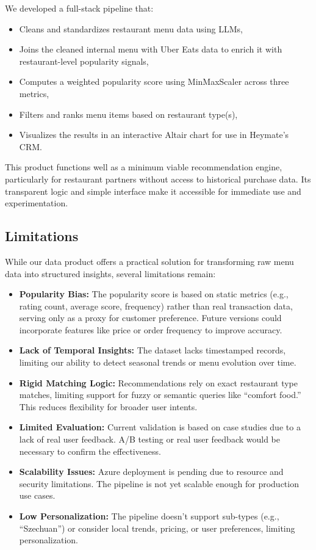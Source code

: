 \documentclass[
  11pt,
  a4paper,
  DIV=11,
  numbers=noendperiod]{scrartcl}
\providecommand{\tightlist}{%
  \setlength{\itemsep}{0pt}\setlength{\parskip}{0pt}}\usepackage{longtable,booktabs,array}
\begin{document}
We developed a full-stack pipeline that:

\begin{itemize}
\tightlist
\item
  Cleans and standardizes restaurant menu data using LLMs,
\item
  Joins the cleaned internal menu with Uber Eats data to enrich it with
  restaurant-level popularity signals,
\item
  Computes a weighted popularity score using MinMaxScaler across three
  metrics,
\item
  Filters and ranks menu items based on restaurant type(s),
\item
  Visualizes the results in an interactive Altair chart for use in
  Heymate's CRM.
\end{itemize}

This product functions well as a minimum viable recommendation engine,
particularly for restaurant partners without access to historical
purchase data. Its transparent logic and simple interface make it
accessible for immediate use and experimentation.

\subsection{Limitations}\label{limitations-1}

While our data product offers a practical solution for transforming raw
menu data into structured insights, several limitations remain:

\begin{itemize}
\tightlist
\item
  \textbf{Popularity Bias:} The popularity score is based on static
  metrics (e.g., rating count, average score, frequency) rather than
  real transaction data, serving only as a proxy for customer
  preference. Future versions could incorporate features like price or
  order frequency to improve accuracy.
\item
  \textbf{Lack of Temporal Insights:} The dataset lacks timestamped
  records, limiting our ability to detect seasonal trends or menu
  evolution over time.
\item
  \textbf{Rigid Matching Logic:} Recommendations rely on exact
  restaurant type matches, limiting support for fuzzy or semantic
  queries like ``comfort food.'' This reduces flexibility for broader
  user intents.
\item
  \textbf{Limited Evaluation:} Current validation is based on case
  studies due to a lack of real user feedback. A/B testing or real user
  feedback would be necessary to confirm the effectiveness.
\item
  \textbf{Scalability Issues:} Azure deployment is pending due to
  resource and security limitations. The pipeline is not yet scalable
  enough for production use cases.
\item
  \textbf{Low Personalization:} The pipeline doesn't support sub-types
  (e.g., ``Szechuan'') or consider local trends, pricing, or user
  preferences, limiting personalization.
\end{itemize}
\end{document}
